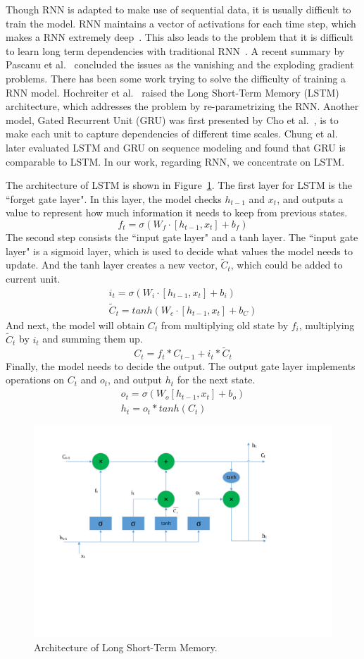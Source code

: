 Though RNN is adapted to make use of sequential data, it is usually difficult to train the model. RNN maintains a vector of activations for each time step, which makes a RNN extremely deep~\cite{jozefowicz2015}. This also leads to the problem that it is difficult to learn long term dependencies with traditional RNN~\cite{bengio1994}. A recent summary by Pascanu et al.~\cite{pascanu2012} concluded the issues as the vanishing and the exploding gradient problems. There has been some work trying to solve the difficulty of training a RNN model. Hochreiter et al.~\cite{hochreiter1997} raised the Long Short-Term Memory (LSTM) architecture, which addresses the problem by re-parametrizing the RNN. Another model, Gated Recurrent Unit (GRU) was first presented by Cho et al.~\cite{cho2014}, is to make each unit to capture dependencies of different time scales. Chung et al.~\cite{chung2014} later evaluated LSTM and GRU on sequence modeling and found that GRU is comparable to LSTM. In our work, regarding RNN, we concentrate on LSTM.

The architecture of LSTM is shown in Figure~\ref{fig:lstm}. The first layer for LSTM is the ``forget gate layer". In this layer, the model checks $h_{t-1}$ and $x_t$, and outputs a value to represent how much information it needs to keep from previous states. 
$$f_t = \sigma (W_f \cdot [h_{t-1}, x_t] + b_f)$$
The second step consists the ``input gate layer" and a tanh layer. The ``input gate layer" is a sigmoid layer, which is used to decide what values the model needs to update. And the tanh layer creates a new vector, $\tilde{C}_t$, which could be added to current unit. 
\begin{align*}
i_t = \sigma (W_i \cdot [h_{t-1}, x_t] + b_i) \\
\tilde{C}_t = tanh(W_c \cdot [h_{t-1}, x_t] + b_C)
\end{align*}
And next, the model will obtain $C_t$ from multiplying old state by $f_i$, multiplying $\tilde{C}_t$ by $i_t$ and summing them up. 
$$C_t = f_t * C_{t-1} + i_t * \tilde{C}_t$$
Finally, the model needs to decide the output. The output gate layer implements operations on $C_t$ and $o_t$, and output $h_t$ for the next state.
\begin{align*}
o_t = \sigma (W_o [h_{t-1}, x_t] + b_o) \\
h_t = o_t * tanh(C_t)
\end{align*}

\begin{figure}
\centering
\includegraphics[scale=0.6]{figure/lstm.pdf}
\caption{Architecture of Long Short-Term Memory.}
\label{fig:lstm}
\end{figure}